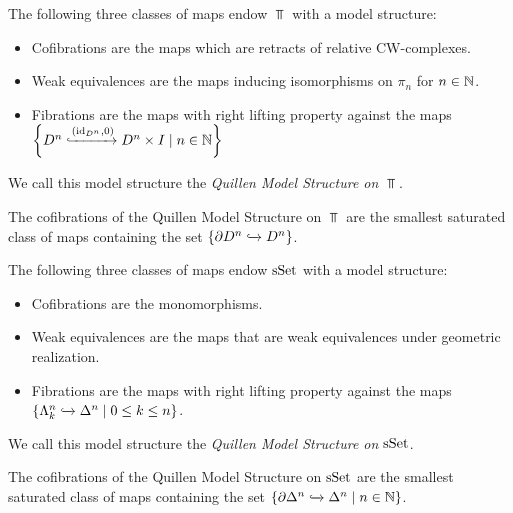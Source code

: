\begin{prop}
    The following three classes of maps endow $\Top$ with a model structure:
    \begin{itemize}
        \item Cofibrations are the maps which are retracts of relative CW-complexes. %
        \item Weak equivalences are the maps inducing isomorphisms on $\pi_n$ for $n\in\mathbb{N}$.
        \item Fibrations are the maps with right lifting property against the maps $\left\lbrace D^n\xhookrightarrow{\left(\text{id}_{D^n},0\right)}D^n\times I\mid n\in\mathbb{N}\right\rbrace$
    \end{itemize}
    We call this model structure the \emph{Quillen Model Structure on $\Top$}.
\end{prop}
\begin{prop}
    The cofibrations of the Quillen Model Structure on $\Top$ are the smallest saturated class of maps containing the set $\left\lbrace\partial D^n\xhookrightarrow{}D^n\right\rbrace$.
\end{prop}
\begin{prop}
    The following three classes of maps endow $\operatorname{sSet}$ with a model structure:
    \begin{itemize}
        \item Cofibrations are the monomorphisms.
        \item Weak equivalences are the maps that are weak equivalences under geometric realization. %
        \item Fibrations are the maps with right lifting property against the maps $\left\lbrace\Lambda_k^n\xhookrightarrow{}\Delta^n\mid 0\leq k\leq n\right\rbrace$.
    \end{itemize}
    We call this model structure the \emph{Quillen Model Structure on $\operatorname{sSet}$}.
\end{prop}
\begin{prop}
    The cofibrations of the Quillen Model Structure on $\operatorname{sSet}$ are the smallest saturated class of maps containing the set $\left\lbrace\partial\Delta^n\xhookrightarrow{}\Delta^n\mid n\in\mathbb{N}\right\rbrace$.
\end{prop}
